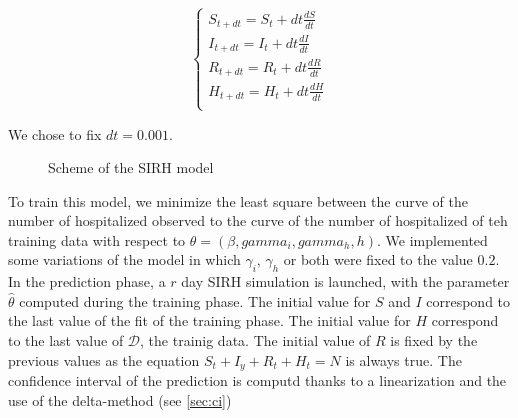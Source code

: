 \begin{equation}
    \left\{
    \begin{aligned}
        S_{t+dt}=S_t + dt \frac{dS}{dt}\\
        I_{t+dt}=I_t + dt \frac{dI}{dt}\\
        R_{t+dt}=R_t + dt \frac{dR}{dt}\\
        H_{t+dt}=H_t + dt \frac{dH}{dt}\\
    \end{aligned}
    \right.
\end{equation}


We chose to fix $dt=0.001$. 


\begin{figure}[h]
    \centering
    \caption{Scheme of the SIRH model}
    \label{fig:sirh}

    
\end{figure}


To train this model, we minimize the least square between the curve of the number of hospitalized observed to the curve of the number of hospitalized of teh training data with respect to $\theta = (\beta, gamma_i, gamma_h, h)$. 
We implemented some variations of the model in which $\gamma_i$, $\gamma_h$ or both were fixed to the value $0.2$. 
In the prediction phase, a $r$ day SIRH simulation is launched, with the parameter $\hat{\theta}$ computed during the training phase. 
The initial value for $S$ and $I$ correspond to the last value of the fit of the training phase. 
The initial value for $H$ correspond to the last value of $\mathcal{D}$, the trainig data. 
The initial value of $R$ is fixed by the previous values as the equation $S_t + I_y + R_t + H_t = N$ is always true. 
The confidence interval of the prediction is computd thanks to a linearization and the use of the delta-method (see \ref{sec:ci})


